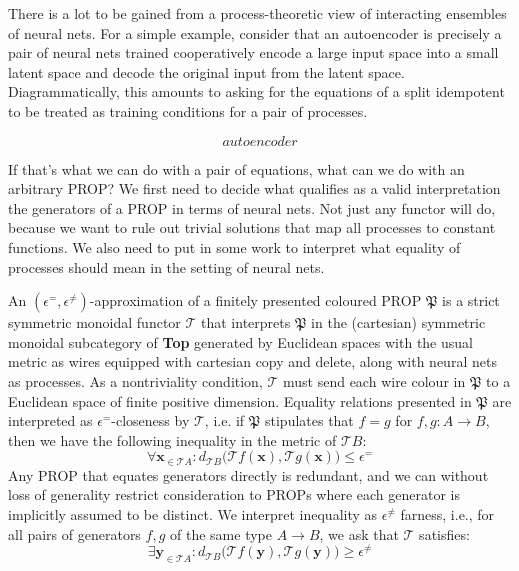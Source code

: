 \begin{fullwidth}
There is a lot to be gained from a process-theoretic view of interacting ensembles of neural nets. For a simple example, consider that an autoencoder is precisely a pair of neural nets trained cooperatively encode a large input space into a small latent space and decode the original input from the latent space. Diagrammatically, this amounts to asking for the equations of a split idempotent to be treated as training conditions for a pair of processes.

\[autoencoder\]

If that's what we can do with a pair of equations, what can we do with an arbitrary PROP? We first need to decide what qualifies as a valid interpretation the generators of a PROP in terms of neural nets. Not just any functor will do, because we want to rule out trivial solutions that map all processes to constant functions. We also need to put in some work to interpret what equality of processes should mean in the setting of neural nets.

\begin{defn}
An $(\epsilon^{=},\epsilon^{\neq})$-approximation of a finitely presented coloured PROP $\mathfrak{P}$ is a strict symmetric monoidal functor $\mathcal{T}$ that interprets $\mathfrak{P}$ in the (cartesian) symmetric monoidal subcategory of \textbf{Top} generated by Euclidean spaces with the usual metric as wires equipped with cartesian copy and delete, along with neural nets as processes. As a nontriviality condition, $\mathcal{T}$ must send each wire colour in $\mathfrak{P}$ to a Euclidean space of finite positive dimension. Equality relations presented in $\mathfrak{P}$ are interpreted as $\epsilon^{=}$-closeness by $\mathcal{T}$, i.e. if $\mathfrak{P}$ stipulates that $f = g$ for $f,g: A \rightarrow B$, then we have the following inequality in the metric of $\mathcal{T}B$:
\[\forall \mathbf{x}_{\in\mathcal{T}A} : d_{\mathcal{T}B}\big(\mathcal{T}f(\mathbf{x}),\mathcal{T}g(\mathbf{x})\big) \leq \epsilon^{=}\]
Any PROP that equates generators directly is redundant, and we can without loss of generality restrict consideration to PROPs where each generator is implicitly assumed to be distinct. We interpret inequality as $\epsilon^{\neq}$ farness, i.e., for all pairs of generators $f,g$ of the same type $A \rightarrow B$, we ask that $\mathcal{T}$ satisfies:
\[\exists \mathbf{y}_{\in\mathcal{T}A} : d_{\mathcal{T}B}\big(\mathcal{T}f(\mathbf{y}),\mathcal{T}g(\mathbf{y})\big) \geq \epsilon^{\neq} \]
\end{defn}


\end{fullwidth}
